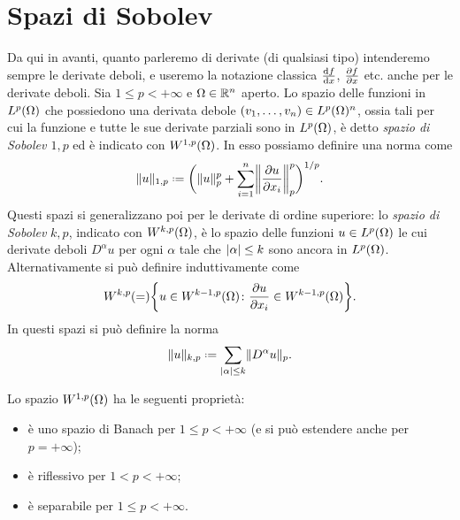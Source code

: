\section{Spazi di Sobolev}
Da qui in avanti, quanto parleremo di derivate (di qualsiasi tipo) intenderemo sempre le derivate deboli, e useremo la notazione classica $\drv{f}{x}$, $\drp{f}{x}$ etc. anche per le derivate deboli.
Sia $1\le p<+\infty$ e $\Omega\in\R^n$ aperto.
Lo spazio delle funzioni in $\leb[p]{\Omega}$ che possiedono una derivata debole $(v_1,\dotsc,v_n)\in\leb[p]{\Omega}^n$, ossia tali per cui la funzione e tutte le sue derivate parziali sono in $\leb[p]{\Omega}$, è detto \emph{spazio di Sobolev $1,p$} ed è indicato con $\sobW[1,p]{\Omega}$.
In esso possiamo definire una norma come
\begin{equation}
    \norm{u}_{1,p}\defeq\biggl(\norm{u}_p^p+\sum_{i=1}^n\norm[\bigg]{\drp{u}{x_i}}_p^p\biggr)^{1/p}.
    \label{eq:norma-W1p}
\end{equation}
Questi spazi si generalizzano poi per le derivate di ordine superiore: lo \emph{spazio di Sobolev} $k,p$, indicato con $\sobW[k,p]{\Omega}$, è lo spazio delle funzioni $u\in\leb[p]{\Omega}$ le cui derivate deboli $D^\alpha u$ per ogni $\alpha$ tale che $\abs{\alpha}\le k$ sono ancora in $\leb[p]{\Omega}$.
Alternativamente si può definire induttivamente come
\begin{equation}
    \sobW[k,p]=\biggl\{u\in\sobW[k-1,p]{\Omega}\colon \drp{u}{x_i}\in\sobW[k-1,p]{\Omega}\biggr\}.
\end{equation}
In questi spazi si può definire la norma
\begin{equation}
    \norm{u}_{k,p}\defeq\sum_{\abs{\alpha}\le k}\norm{D^\alpha u}_p.
    \label{eq:norma-Wkp}
\end{equation}
\begin{proprieta}
    Lo spazio $\sobW[1,p]{\Omega}$ ha le seguenti proprietà:
    \begin{itemize}
        \item è uno spazio di Banach per $1\le p<+\infty$ (e si può estendere anche per $p=+\infty$);
        \item è riflessivo per $1<p<+\infty$;
        \item è separabile per $1\le p<+\infty$.
    \end{itemize}
\end{proprieta}
